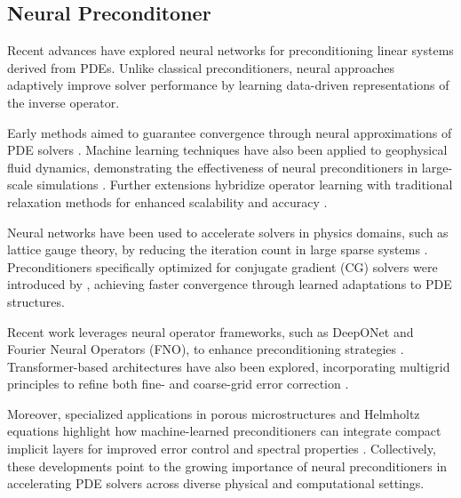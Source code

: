 \subsection{Neural Preconditoner}

Recent advances have explored neural networks for preconditioning linear systems derived from PDEs. Unlike classical preconditioners, neural approaches adaptively improve solver performance by learning data-driven representations of the inverse operator.

Early methods aimed to guarantee convergence through neural approximations of PDE solvers \cite{19:LearningNeural}. Machine learning techniques have also been applied to geophysical fluid dynamics, demonstrating the effectiveness of neural preconditioners in large-scale simulations \cite{20:MachineLearned}. Further extensions hybridize operator learning with traditional relaxation methods for enhanced scalability and accuracy \cite{22:AHybrid}.

Neural networks have been used to accelerate solvers in physics domains, such as lattice gauge theory, by reducing the iteration count in large sparse systems \cite{22:NeuralNetwork}. Preconditioners specifically optimized for conjugate gradient (CG) solvers were introduced by \cite{23:LearningPre}, achieving faster convergence through learned adaptations to PDE structures.

Recent work leverages neural operator frameworks, such as DeepONet and Fourier Neural Operators (FNO), to enhance preconditioning strategies \cite{24:DeepOnet}. Transformer-based architectures have also been explored, incorporating multigrid principles to refine both fine- and coarse-grid error correction \cite{24:MultigridAugmented,24:fcg-no}.

Moreover, specialized applications in porous microstructures and Helmholtz equations highlight how machine-learned preconditioners can integrate compact implicit layers for improved error control and spectral properties \cite{24:Machine}. Collectively, these developments point to the growing importance of neural preconditioners in accelerating PDE solvers across diverse physical and computational settings.
